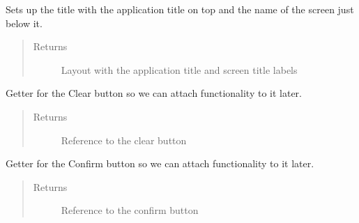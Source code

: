 \documentclass[letterpaper,10pt,english]{sphinxmanual}
\begin{document}
\begin{fulllineitems}
\begin{fulllineitems}
\label{\detokenize{index:src.Views.View_TrackingScreen.TrackingWindow.setTitle}}
Sets up the title with the application title on top and the name of the screen just below it.
\begin{quote}\begin{description}
\item[{Returns}] \leavevmode
Layout with the application title and screen title labels

\end{description}\end{quote}

\end{fulllineitems}


\begin{fulllineitems}
\label{\detokenize{index:src.Views.View_TrackingScreen.TrackingWindow.set_BtnClear}}
Getter for the Clear button so we can attach functionality to it later.
\begin{quote}\begin{description}
\item[{Returns}] \leavevmode
Reference to the clear button

\end{description}\end{quote}

\end{fulllineitems}


\begin{fulllineitems}
\label{\detokenize{index:src.Views.View_TrackingScreen.TrackingWindow.set_BtnConfirm}}
Getter for the Confirm button so we can attach functionality to it later.
\begin{quote}\begin{description}
\item[{Returns}] \leavevmode
Reference to the confirm button


\end{description}
\end{quote}
\end{fulllineitems}
\end{fulllineitems}
\end{document}
